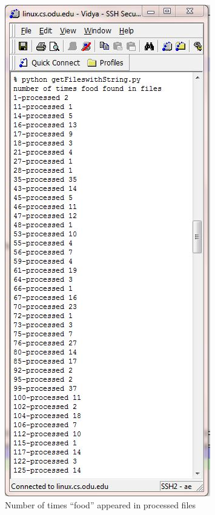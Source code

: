 \newpage
\begin{figure}[h!]
\begin{center}
\includegraphics[scale=0.55, keepaspectratio=true]{figures/food.JPG}
\caption{Number of times ``food'' appeared in processed files}
\label{fig:q2fig2}
\end{center}
\end{figure}


